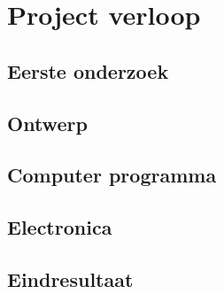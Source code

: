 \chapter{Project verloop}

\section{Eerste onderzoek}

\section{Ontwerp}

\section{Computer programma}

\section{Electronica}

\section{Eindresultaat}
